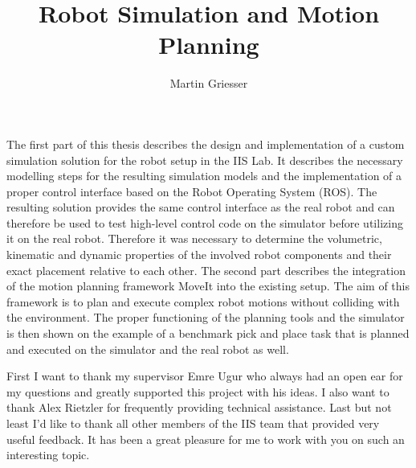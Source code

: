 \documentclass[bachelor]{iisthesis}
\title{Robot Simulation and Motion Planning}
\author{Martin Griesser}
\begin{document}
\maketitle

The first part of this thesis describes the design and implementation of a custom simulation solution for the robot setup in the IIS Lab. It describes the necessary modelling steps for the resulting simulation models and the implementation of a proper control interface based on the Robot Operating System (ROS). The resulting solution provides the same control interface as the real robot and can therefore be used to test high-level control code on the simulator before utilizing it on the real robot. Therefore it was necessary to determine the volumetric, kinematic and dynamic properties of the involved robot components and their exact placement relative to each other. The second part describes the integration of the motion planning framework MoveIt into the existing setup. The aim of this framework is to plan and execute complex robot motions without colliding with the environment. The proper functioning of the planning tools and the simulator is then shown on the example of a benchmark pick and place task that is planned and executed on the simulator and the real robot as well.


First I want to thank my supervisor Emre Ugur who always had an open ear for my questions and greatly supported this project with his ideas. I also want to thank Alex Rietzler for frequently providing technical assistance. Last but not least I'd like to thank all other members of the IIS team that  provided very useful feedback. It has been a great pleasure for me to work with you on such an interesting topic.

\tableofcontents
\listoffigures
\listoftables

\uibkdeclaration
\label{chap:declare}








\appendix%


\end{document}
